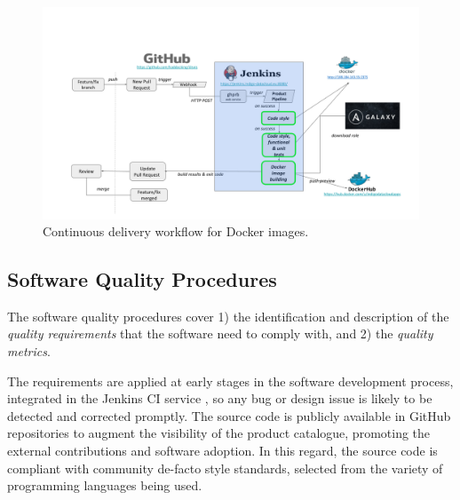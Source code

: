 \documentclass[journal]{IEEEtran}
\begin{document}
\begin{figure}[!t]
\centering
\includegraphics[scale=0.21]{images/devops.png}
\caption{Continuous delivery workflow for Docker images.}
\label{fig:fig_CD}
\end{figure}

\subsection{Software Quality Procedures}

The software quality procedures \cite{indigo-d31} cover 1) the identification and description of the \emph{quality requirements} that the software need to comply with, and 2) the \emph{quality metrics}.

The requirements are applied at early stages in the software development process, integrated in the Jenkins CI service \cite{indigo-jenkins}, so any bug or design issue is likely to be detected and corrected promptly. The source code is publicly available in GitHub repositories \cite{indigo-github} to augment the visibility of the product catalogue, promoting the external contributions and software adoption. In this regard, the source code is compliant with community de-facto style standards, selected from the variety of programming languages being used.
\end{document}
